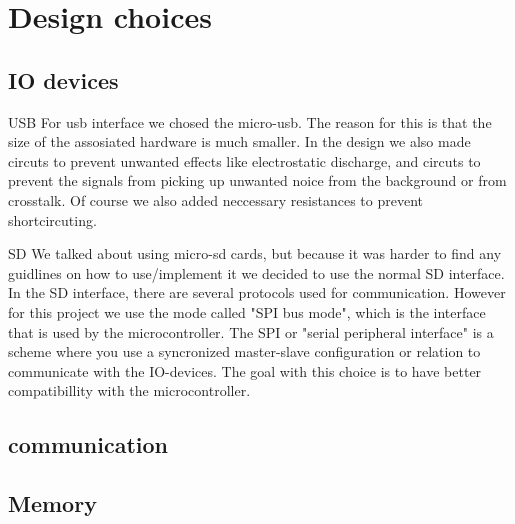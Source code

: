 \section {Design choices}

\subsection{IO devices} \label{pcb:design-choices:ss:IO_devices}
USB
For usb interface we chosed the micro-usb. 
The reason for this is that the size of the assosiated hardware is much smaller.
In the design we also made circuts to prevent unwanted effects like electrostatic discharge, and circuts to prevent the signals from picking up unwanted noice from the background or from crosstalk.
Of course we also added neccessary resistances to prevent shortcircuting.

SD
We talked about using micro-sd cards, but because it was harder to find any guidlines on how to use/implement it we decided to use the normal SD interface.
In the SD interface, there are several protocols used for communication. 
However for this project we use the mode called "SPI bus mode", which is the interface that is used by the microcontroller.  
The SPI or "serial peripheral interface" is a scheme where you use a syncronized master-slave configuration or relation to communicate with the IO-devices. 
The goal with this choice is to have better compatibillity with the microcontroller.



\subsection{communication} \label{pcb:design-choices:ss:internal_communication}

\subsection{Memory} \label{pcb:design-choices:ss:memory}


